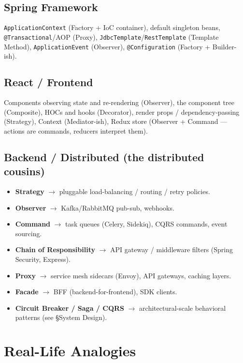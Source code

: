 \documentclass[11pt]{article}
\providecommand{\tightlist}{\setlength{\itemsep}{1pt}\setlength{\parskip}{0pt}}
\begin{document}
\subsection{Spring Framework}\label{spring-framework}

\texttt{ApplicationContext} (Factory + IoC container), default singleton beans, \texttt{@Transactional}/AOP (Proxy), \texttt{JdbcTemplate}/\texttt{RestTemplate} (Template Method), \texttt{ApplicationEvent} (Observer), \texttt{@Configuration} (Factory + Builder-ish).

\subsection{React / Frontend}\label{react--frontend}

Components observing state and re-rendering (Observer), the component tree (Composite), HOCs and hooks (Decorator), render props / dependency-passing (Strategy), Context (Mediator-ish), Redux store (Observer + Command --- actions are commands, reducers interpret them).

\subsection{Backend / Distributed (the distributed cousins)}\label{backend--distributed-the-distributed-cousins}

\begin{itemize}
\tightlist
\item
  \textbf{Strategy} \(\rightarrow\) pluggable load-balancing / routing / retry policies.
\item
  \textbf{Observer} \(\rightarrow\) Kafka/RabbitMQ pub-sub, webhooks.
\item
  \textbf{Command} \(\rightarrow\) task queues (Celery, Sidekiq), CQRS commands, event sourcing.
\item
  \textbf{Chain of Responsibility} \(\rightarrow\) API gateway / middleware filters (Spring Security, Express).
\item
  \textbf{Proxy} \(\rightarrow\) service mesh sidecars (Envoy), API gateways, caching layers.
\item
  \textbf{Facade} \(\rightarrow\) BFF (backend-for-frontend), SDK clients.
\item
  \textbf{Circuit Breaker / Saga / CQRS} \(\rightarrow\) architectural-scale behavioral patterns (see §System Design).
\end{itemize}

\section{Real-Life Analogies}\label{real-life-analogies}
\end{document}
